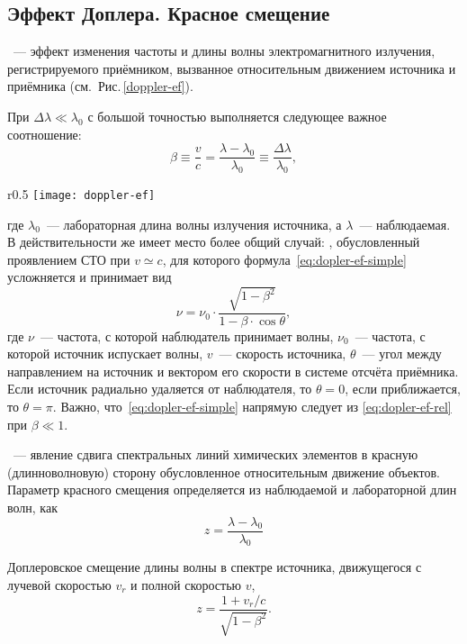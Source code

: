 \subsection{Эффект Доплера. Красное смещение} 
~--- эффект изменения частоты и длины волны электромагнитного излучения, регистрируемого приёмником, вызванное относительным движением источника и приёмника (см.~Рис.\,\ref{doppler-ef}).

При $\Delta \lambda \ll \lambda_0$ с большой точностью выполняется следующее важное соотношение:\begin{equation}
	\beta \equiv \dfrac{v}{c} = \dfrac{\lambda - \lambda_0}{\lambda_0} \equiv \dfrac{\Delta \lambda}{\lambda_0},
	\label{eq:dopler-ef-simple}
\end{equation}
\begin{wrapfigure}[6]{r}{0.5\tw}
	\centering
	\vspace{-.5pc}
	\texttt{[image: doppler-ef]}
	\caption{Эффект Доплера}
	\label{doppler-ef}
\end{wrapfigure}
где $\lambda_0$~--- лабораторная длина волны излучения источника, а $\lambda$~--- наблюдаемая. В действительности же имеет место более общий случай: , обусловленный проявлением СТО при $v \simeq c$, для которого формула~\eqref{eq:dopler-ef-simple} усложняется и принимает вид 
\begin{equation}
	\nu = \nu_0 \cdot \dfrac{\sqrt{1 - \beta^2}}{1 - \beta \cdot \cos\theta},
	\label{eq:dopler-ef-rel}
\end{equation}
где $\nu$~--- частота, с которой наблюдатель принимает волны, $\nu_0$~--- частота, с которой источник испускает волны, $v$~--- скорость источника, $\theta$~--- угол между направлением на источник и вектором его скорости в системе отсчёта приёмника. Если источник радиально удаляется от наблюдателя, то $\theta = 0$, если приближается, то $\theta =\pi$. Важно, что~\eqref{eq:dopler-ef-simple} напрямую следует из \eqref{eq:dopler-ef-rel} при $\beta  \ll 1$.

~--- явление сдвига спектральных линий химических элементов в красную (длинноволновую) сторону обусловленное относительным движение объектов. Параметр красного смещения определяется из наблюдаемой и лабораторной длин волн, как
\begin{equation}
	z = \dfrac{\lambda - \lambda_0}{\lambda_0}
\end{equation}

Доплеровское смещение длины волны в спектре источника, движущегося с лучевой скоростью $v_{r}$ и полной скоростью $v$,
\begin{equation}
z = \dfrac{1 + v_r / c}{\sqrt{1 - \beta^2}}.
\end{equation}

